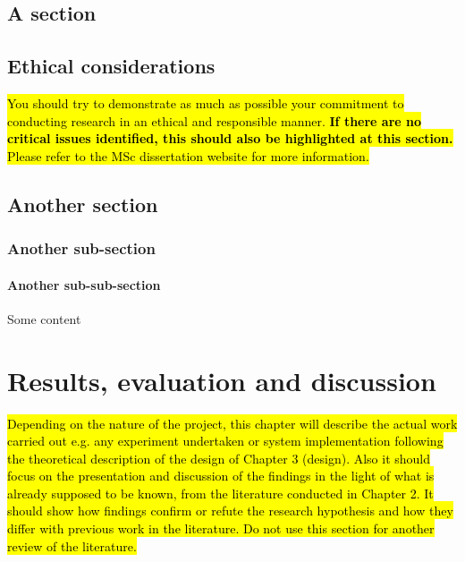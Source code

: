 \documentclass[oneside,12pt]{book}
\begin{document}
\section{A section}

\section {Ethical considerations}


\hl{You should try to demonstrate as much as possible your commitment to conducting research in an ethical and responsible manner. \textbf{If there are no critical issues identified, this should also be highlighted at this section.} Please refer to the MSc dissertation website for more information.}

\section{Another section}

\subsection{Another sub-section}

\subsubsection{Another sub-sub-section}

Some content

\chapter{Results, evaluation and discussion}
\hl{Depending on the nature of the project, this chapter will describe the actual work carried out e.g. any experiment undertaken or system implementation following the theoretical description of the design of Chapter 3 (design). Also it should focus on the presentation and discussion of the findings in the light of what is already supposed to be known, from the literature conducted in Chapter 2. It should show how findings confirm or refute the research hypothesis and how they differ with previous work in the literature. Do not use this section for another review of the literature.}
\end{document}
